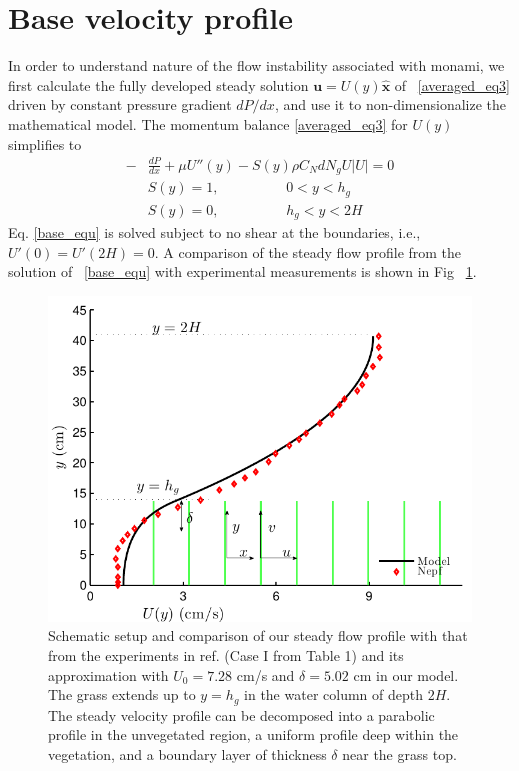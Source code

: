 \documentclass[12pt]{report}   %
\newcommand{\bu}{\mathbf{u}}
\newcommand{\hg}{h_g}
\begin{document}
\section{Base velocity profile}
In order to understand nature of the flow instability associated with monami, we first calculate the fully developed steady solution $\bu = U(y)\boldsymbol{\hat{x}}$ of ~\eqref{averaged_eq3} driven by constant pressure gradient $dP/dx$, and use it to non-dimensionalize the mathematical model. The momentum balance \eqref{averaged_eq3} for $U(y)$ simplifies to
\begin{equation}
\begin{split}
 -&\frac{dP}{dx}+\mu U''(y) -S(y) \rho C_N d N_gU |U| =0\\
 &S(y) = 1, \hspace{2cm} 0<y<\hg\\
 &S(y) = 0, \hspace{2cm} \hg< y< 2H
\label{base_equ}
\end{split}
\end{equation}
Eq. \eqref{base_equ} is solved subject to no shear at the boundaries, i.e., $U'(0) = U'(2H) = 0$.
A comparison of the steady flow profile from the solution of ~\eqref{base_equ} with experimental measurements is shown in Fig ~\ref{basicflow}.
\begin{figure}
\centerline{\includegraphics[scale=.99]{Grass_Base_Nepf} }
\caption{
Schematic setup and comparison of our steady flow profile with that from the experiments in ref. \cite{Nepf04} (Case I from Table 1) %
 and its approximation with $U_0=7.28$ cm/s and $\delta = 5.02$ cm in our model. The grass extends up to $y=\hg$ in the water column of depth $2H$. 
The steady velocity profile can be decomposed into a parabolic profile in the unvegetated region, a uniform profile deep within the vegetation, and a boundary layer of thickness $\delta$ near the grass top. 
}
\label{basicflow}
\end{figure}
\end{document}
